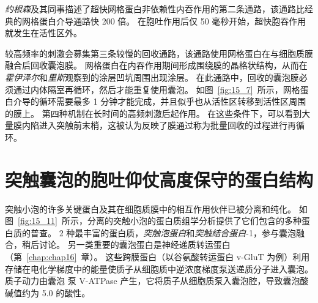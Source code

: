 \textit{约根森}及其同事描述了超快网格蛋白非依赖性内吞作用的第二条通路，该通路比经典的网格蛋白介导通路快 200 倍。
在胞吐作用后仅 50 毫秒开始，超快胞吞作用就发生在活性区外。


较高频率的刺激会募集第三条较慢的回收通路，该通路使用网格蛋白在与细胞质膜融合后回收囊泡膜。
网格蛋白在内吞作用期间形成围绕膜的晶格状结构，从而在\textit{霍伊泽尔}和\textit{里斯}观察到的涂层凹坑周围出现涂层。
在此通路中，回收的囊泡膜必须通过内体隔室再循环，然后才能重复使用囊泡。
如图~\ref{fig:15_7}~所示，网格蛋白介导的循环需要最多 1 分钟才能完成，并且似乎也从活性区转移到活性区周围的膜上。
第四种机制在长时间的高频刺激后起作用。
在这些条件下，可以看到大量膜内陷进入突触前末梢，这被认为反映了膜通过称为批量回收的过程进行再循环。



\section{突触囊泡的胞吐仰仗高度保守的蛋白结构}

突触小泡的许多关键蛋白及其在细胞质膜中的相互作用伙伴已被分离和纯化。
如图~\ref{fig:15_11}~所示，分离的突触小泡的蛋白质组学分析提供了它们包含的多种蛋白质的普查。
2 种最丰富的蛋白质，\textit{突触泡蛋白}和\textit{突触结合蛋白}-1，参与囊泡融合，稍后讨论。
另一类重要的囊泡蛋白是神经递质转运蛋白（第~\ref{chap:chap16}~章）。
这些跨膜蛋白（以谷氨酸转运蛋白 v-GluT 为例）利用存储在电化学梯度中的能量使质子从细胞质中逆浓度梯度泵送递质分子进入囊泡。
质子动力由囊泡  泵 V-ATPase 产生，它将质子从细胞质泵入囊泡腔，导致囊泡酸碱值约为 5.0 的酸性。


